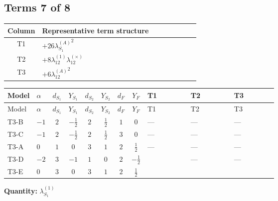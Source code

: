 \documentclass[8pt]{article}
\begin{document}
\begin{landscape}
\subsection*{Terms 7 of 8}
\begin{center}
\begin{tabular}{@{}c >{\raggedright\arraybackslash}p{0.82\linewidth}@{}}
\toprule
Column & Representative term structure \\
\midrule
T1 & \(\displaystyle +26 {\lambda_{S_1}^{(A)}}^2\) \\
\midrule
T2 & \(\displaystyle +8 {\lambda_{12}^{(1)}} {\lambda_{12}^{(\times)}}\) \\
\midrule
T3 & \(\displaystyle +6 {\lambda_{12}^{(A)}}^2\) \\
\midrule
\bottomrule
\end{tabular}
\end{center}
\smallskip
\tiny
\begin{longtable}{@{}llcccccc >{\raggedright\arraybackslash}p{0.21\linewidth} >{\raggedright\arraybackslash}p{0.21\linewidth} >{\raggedright\arraybackslash}p{0.21\linewidth}@{}}
\toprule
Model & $\alpha$ & $d_{S_1}$ & $Y_{S_1}$ & $d_{S_2}$ & $Y_{S_2}$ & $d_F$ & $Y_F$ & T1 & T2 & T3 \\
\midrule
\endfirsthead
\toprule
Model & $\alpha$ & $d_{S_1}$ & $Y_{S_1}$ & $d_{S_2}$ & $Y_{S_2}$ & $d_F$ & $Y_F$ & T1 & T2 & T3 \\
\midrule
\endhead
T3-B & $-1$ & $2$ & $-\frac{1}{2}$ & $2$ & $\frac{1}{2}$ & $1$ & $0$ & --- & --- & --- \\
\midrule
T3-C & $-1$ & $2$ & $-\frac{1}{2}$ & $2$ & $\frac{1}{2}$ & $3$ & $0$ & --- & --- & --- \\
\midrule
T3-A & $0$ & $1$ & $0$ & $3$ & $1$ & $2$ & $\frac{1}{2}$ & --- & --- & --- \\
\midrule
T3-D & $-2$ & $3$ & $-1$ & $1$ & $0$ & $2$ & $-\frac{1}{2}$ & \scriptsize\adjustbox{max width=\linewidth}{$\begin{gathered} +26 {\lambda_{S_1}^{(A)}}^2\end{gathered}$} & --- & --- \\
\midrule
T3-E & $0$ & $3$ & $0$ & $3$ & $1$ & $2$ & $\frac{1}{2}$ & \scriptsize\adjustbox{max width=\linewidth}{$\begin{gathered} +26 {\lambda_{S_1}^{(A)}}^2\end{gathered}$} & \scriptsize\adjustbox{max width=\linewidth}{$\begin{gathered} +8 {\lambda_{12}^{(1)}} {\lambda_{12}^{(\times)}}\end{gathered}$} & \scriptsize\adjustbox{max width=\linewidth}{$\begin{gathered} +6 {\lambda_{12}^{(A)}}^2\end{gathered}$} \\
\midrule
\bottomrule
\end{longtable}
\clearpage
\noindent\textbf{Quantity: }$\lambda_{S_1}^{(1)}$\par\smallskip

\end{landscape}
\end{document}
